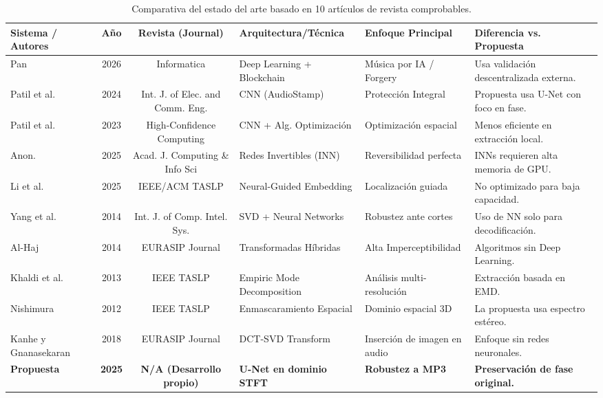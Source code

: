 \begin{table}
    \centering
    \scriptsize
    \caption{Comparativa del estado del arte basado en 10 artículos de revista comprobables.}
    \label{tab:comparativa_detallada}
    \begin{tabular}{|L{2.2cm}|c|c|L{3cm}|L{2.5cm}|L{2cm}|}
        \hline
        \textbf{Sistema / Autores} & \textbf{A\~no} & \textbf{Revista (Journal)} & \textbf{Arquitectura/Técnica} & \textbf{Enfoque Principal} & \textbf{Diferencia vs. Propuesta} \\
        \hline
        Pan \cite{Pan_2026} & 2026 & Informatica & Deep Learning + Blockchain & Música por IA / Forgery & Usa validación descentralizada externa. \\
        \hline
        Patil et al. \cite{Patil_2024} & 2024 & Int. J. of Elec. and Comm. Eng. & CNN (AudioStamp) & Protección Integral & Propuesta usa U-Net con foco en fase. \\
        \hline
        Patil et al. \cite{Patil_2023} & 2023 & High-Confidence Computing & CNN + Alg. Optimización & Optimización espacial & Menos eficiente en extracción local. \\
        \hline
        Anon. \cite{AJCIS_2025} & 2025 & Acad. J. Computing \& Info Sci & Redes Invertibles (INN) & Reversibilidad perfecta & INNs requieren alta memoria de GPU. \\
        \hline
        Li et al. \cite{Li_2025} & 2025 & IEEE/ACM TASLP & Neural-Guided Embedding & Localización guiada & No optimizado para baja capacidad. \\
        \hline
        Yang et al. \cite{Yang_2014} & 2014 & Int. J. of Comp. Intel. Sys. & SVD + Neural Networks & Robustez ante cortes & Uso de NN solo para decodificación. \\
        \hline
        Al-Haj \cite{Al_Haj_2014} & 2014 & EURASIP Journal & Transformadas Híbridas & Alta Imperceptibilidad & Algoritmos sin Deep Learning. \\
        \hline
        Khaldi et al. \cite{Khaldi_2013} & 2013 & IEEE TASLP & Empiric Mode Decomposition & Análisis multi-resolución & Extracción basada en EMD. \\
        \hline
        Nishimura \cite{Nishimura_2012} & 2012 & IEEE TASLP & Enmascaramiento Espacial & Dominio espacial 3D & La propuesta usa espectro estéreo. \\
        \hline
        Kanhe y Gnanasekaran \cite{Kanhe_2018} & 2018 & EURASIP Journal & DCT-SVD Transform & Inserción de imagen en audio & Enfoque sin redes neuronales. \\
        \hline
        \textbf{Propuesta} & \textbf{2025} & \textbf{N/A (Desarrollo propio)} & \textbf{U-Net en dominio STFT} & \textbf{Robustez a MP3} & \textbf{Preservación de fase original.} \\
        \hline
    \end{tabular}
\end{table}

